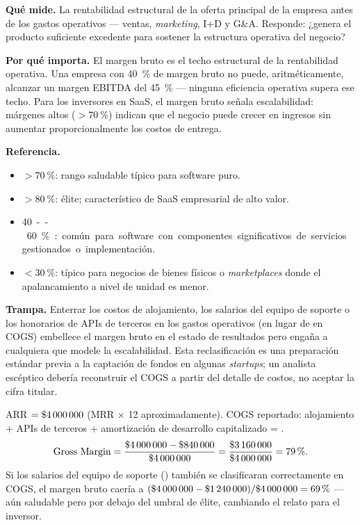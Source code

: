 \textbf{Qué mide.} La rentabilidad estructural de la oferta principal de la empresa antes de
los gastos operativos --- ventas, \emph{marketing}, I+D y G\&A. Responde: ¿genera el
producto suficiente excedente para sostener la estructura operativa del negocio?

\textbf{Por qué importa.} El margen bruto es el techo estructural de la rentabilidad
operativa. Una empresa con \qty{40}{\percent} de margen bruto no puede, aritméticamente,
alcanzar un margen EBITDA del \qty{45}{\percent} --- ninguna eficiencia operativa supera ese
techo. Para los inversores en SaaS, el margen bruto señala escalabilidad: márgenes altos
($>\qty{70}{\percent}$) indican que el negocio puede crecer en ingresos sin aumentar
proporcionalmente los costos de entrega.

\textbf{Referencia.}
\begin{itemize}
  \item $>\qty{70}{\percent}$: rango saludable típico para software puro.
  \item $>\qty{80}{\percent}$: élite; característico de SaaS empresarial de alto valor.
  \item \qty{40}--\qty{60}{\percent}: común para software con componentes significativos de
    servicios gestionados o implementación.
  \item $<\qty{30}{\percent}$: típico para negocios de bienes físicos o \emph{marketplaces}
    donde el apalancamiento a nivel de unidad es menor.
\end{itemize}

\textbf{Trampa.} Enterrar los costos de alojamiento, los salarios del equipo de soporte o
los honorarios de APIs de terceros en los gastos operativos (en lugar de en COGS) embellece
el margen bruto en el estado de resultados pero engaña a cualquiera que modele la
escalabilidad. Esta reclasificación es una preparación estándar previa a la captación de
fondos en algunas \emph{startups}; un analista escéptico debería reconstruir el COGS a
partir del detalle de costos, no aceptar la cifra titular.

\begin{example}
ARR $= \$\num{4000000}$ (MRR  $\times$ 12 aproximadamente). COGS reportado:
alojamiento  + APIs de terceros  + amortización de desarrollo
capitalizado  = .
\[
  \text{Gross Margin} = \frac{\$\num{4000000} - \$\num{840000}}{\$\num{4000000}}
    = \frac{\$\num{3160000}}{\$\num{4000000}} = \qty{79}{\percent}.
\]
Si los salarios del equipo de soporte () también se clasificaran correctamente
en COGS, el margen bruto caería a $(\$\num{4000000} - \$\num{1240000})/\$\num{4000000} =
\qty{69}{\percent}$ --- aún saludable pero por debajo del umbral de élite, cambiando el
relato para el inversor.
\end{example}


